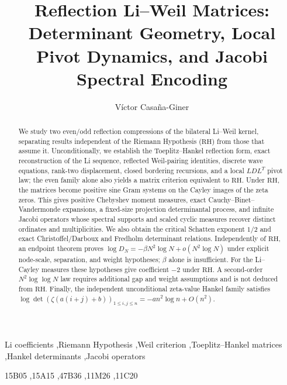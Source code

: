 \documentclass[preprint,12pt]{elsarticle}
\def\corref#1{}%
\numberwithin{equation}{section}
\theoremstyle{plain}
\theoremstyle{definition}
\theoremstyle{remark}
\newcommand{\RH}{\mathrm{RH}}
\begin{document}
\begin{frontmatter}
\title{Reflection Li--Weil Matrices:\\Determinant Geometry, Local Pivot Dynamics, and Jacobi Spectral Encoding}
\author[uned]{Víctor Casaña-Giner\corref{cor1}}

\begin{abstract}
We study two even/odd reflection compressions of the bilateral Li--Weil kernel, separating
results independent of the Riemann Hypothesis (\(\RH\)) from those that assume it.  Unconditionally,
we establish the Toeplitz--Hankel reflection form, exact reconstruction of the Li sequence,
reflected Weil-pairing identities, discrete wave equations, rank-two displacement, closed
bordering recursions, and a local \(LDL^T\) pivot law; the even family alone also yields a matrix
criterion equivalent to \(\RH\).  Under \(\RH\), the matrices become positive sine Gram systems on
the Cayley images of the zeta zeros.  This gives positive Chebyshev moment measures, exact
Cauchy--Binet--Vandermonde expansions, a fixed-size projection determinantal process, and infinite
Jacobi operators whose spectral supports and scaled cyclic measures recover distinct ordinates and
multiplicities.  We also obtain the critical Schatten exponent \(1/2\) and exact
Christoffel/Darboux and Fredholm determinant relations.  Independently of \(\RH\), an endpoint
theorem proves \(\log D_N=-\beta N^2\log N+o(N^2\log N)\) under explicit node-scale, separation,
and weight hypotheses; \(\beta\) alone is insufficient.  For the Li--Cayley measures these
hypotheses give coefficient \(-2\) under \(\RH\).  A second-order \(N^2\log\log N\) law requires
additional gap and weight assumptions and is not deduced from \(\RH\).  Finally, the independent
unconditional zeta-value Hankel family satisfies
\(\log\det(\zeta(a(i+j)+b))_{1\le i,j\le n}=-a n^2\log n+O(n^2)\).
\end{abstract}

\begin{keyword}
Li coefficients \sep Riemann Hypothesis \sep Weil criterion \sep Toeplitz--Hankel matrices
\sep Hankel determinants \sep Jacobi operators

\MSC[2020] 15B05 \sep 15A15 \sep 47B36 \sep 11M26 \sep 11C20
\end{keyword}
\end{frontmatter}
\end{document}
